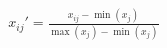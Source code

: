 \begin{align}\label{eq:minmax}
    x_{ij}' = \frac{x_{ij} - \min(x_j)}{\max(x_j)-\min(x_j)} 
\end{align}